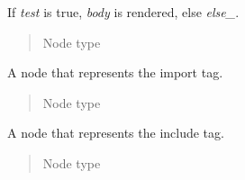 \documentclass[a4paper,10pt,english]{sphinxmanual}
\begin{document}

\begin{fulllineitems}
\label{extensions:jinja2.nodes.If}
If \emph{test} is true, \emph{body} is rendered, else \emph{else\_}.
\begin{quote}\begin{description}
\item[{Node type}] \leavevmode
{\hyperref[extensions:jinja2.nodes.Stmt]{}}

\end{description}\end{quote}

\end{fulllineitems}


\begin{fulllineitems}
\label{extensions:jinja2.nodes.Import}
A node that represents the import tag.
\begin{quote}\begin{description}
\item[{Node type}] \leavevmode
{\hyperref[extensions:jinja2.nodes.Stmt]{}}

\end{description}\end{quote}

\end{fulllineitems}


\begin{fulllineitems}
\label{extensions:jinja2.nodes.Include}
A node that represents the include tag.
\begin{quote}\begin{description}
\item[{Node type}] \leavevmode
{\hyperref[extensions:jinja2.nodes.Stmt]{}}

\end{description}\end{quote}

\end{fulllineitems}
\end{document}
